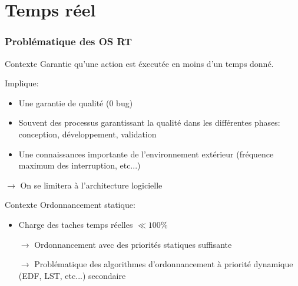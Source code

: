 %
%

\part{Temps réel}

\begin{frame}
  \partpage
\end{frame}

\begin{frame}
  \tableofcontents
\end{frame}

\section{Problématique des OS RT} %

\begin{frame}{Contexte}
  Garantie qu'une action est éxecutée en moins d'un temps donné.

  Implique:
  \begin{itemize}
  \item Une garantie de qualité (0 bug)
  \item  Souvent  des  processus  garantissant  la  qualité  dans  les
    différentes phases: conception, développement, validation
  \item  Une  connaissances  importante de  l'environnement  extérieur
    (fréquence maximum des interruption, etc...)
  \end{itemize}
  $\to$ On se limitera à l'architecture logicielle
\end{frame}

\begin{frame}{Contexte}
  Ordonnancement statique:
  \begin{itemize}
    \item Charge des taches temps réelles $\ll 100\%$
    \item[$\to$]   Ordonnancement   avec   des   priorités   statiques
      suffisante
    \item[$\to$]  Problématique  des  algorithmes  d'ordonnancement  à
      priorité dynamique (EDF, LST, etc...) secondaire
  \end{itemize}
\end{frame}

